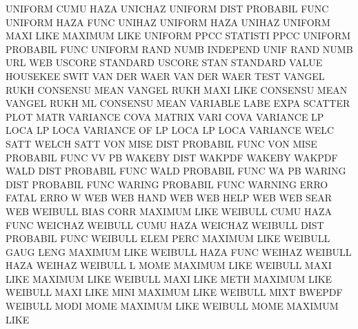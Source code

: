 UNIFORM  CUMU HAZA                      UNICHAZ
UNIFORM  DIST                           PROBABIL FUNC
UNIFORM  HAZA FUNC                      UNIHAZ
UNIFORM  HAZA                           UNIHAZ
UNIFORM  MAXI LIKE                      MAXIMUM  LIKE
UNIFORM  PPCC                           STATISTI PPCC
UNIFORM                                 PROBABIL FUNC
UNIFORM  RAND NUMB                      INDEPEND UNIF RAND NUMB
URL                                     WEB
USCORE                                  STANDARD
USCORE   STAN                           STANDARD
VALUE                                   HOUSEKEE SWIT
VAN      DER  WAER                      VAN      DER  WAER TEST
VANGEL   RUKH                           CONSENSU MEAN
VANGEL   RUKH MAXI LIKE                 CONSENSU MEAN
VANGEL   RUKH ML                        CONSENSU MEAN
VARIABLE LABE EXPA                      SCATTER  PLOT MATR
VARIANCE COVA                           MATRIX   VARI COVA
VARIANCE LP   LOCA                      LP       LOCA
VARIANCE OF   LP   LOCA                 LP       LOCA
VARIANCE WELC SATT                      WELCH    SATT
VON      MISE DIST                      PROBABIL FUNC
VON      MISE                           PROBABIL FUNC
VV                                      PB
WAKEBY   DIST                           WAKPDF
WAKEBY                                  WAKPDF
WALD     DIST                           PROBABIL FUNC
WALD                                    PROBABIL FUNC
WA                                      PB
WARING   DIST                           PROBABIL FUNC
WARING                                  PROBABIL FUNC
WARNING  ERRO                           FATAL    ERRO
W                                       WEB
WEB      HAND                           WEB
WEB      HELP                           WEB
WEB      SEAR                           WEB
WEIBULL  BIAS CORR                      MAXIMUM  LIKE
WEIBULL  CUMU HAZA FUNC                 WEICHAZ
WEIBULL  CUMU HAZA                      WEICHAZ
WEIBULL  DIST                           PROBABIL FUNC
WEIBULL  ELEM PERC                      MAXIMUM  LIKE
WEIBULL  GAUG LENG                      MAXIMUM  LIKE
WEIBULL  HAZA FUNC                      WEIHAZ
WEIBULL  HAZA                           WEIHAZ
WEIBULL  L    MOME                      MAXIMUM  LIKE
WEIBULL  MAXI LIKE                      MAXIMUM  LIKE
WEIBULL  MAXI LIKE METH                 MAXIMUM  LIKE
WEIBULL  MAXI LIKE MINI                 MAXIMUM  LIKE
WEIBULL  MIXT                           BWEPDF
WEIBULL  MODI MOME                      MAXIMUM  LIKE
WEIBULL  MOME                           MAXIMUM  LIKE
